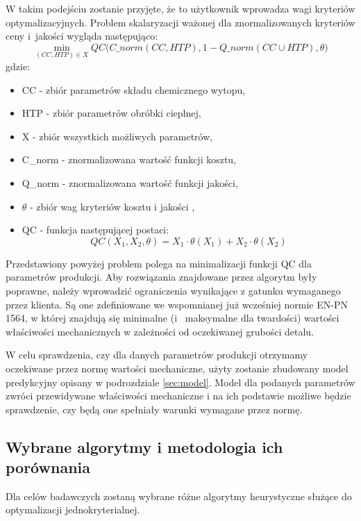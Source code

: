 W takim podejściu zostanie przyjęte, że to użytkownik wprowadza wagi kryteriów optymalizacyjnych. Problem skalaryzacji ważonej dla znormalizowanych kryteriów ceny i~jakości wygląda następująco:
\begin{equation}
     \min_{(CC,HTP) \in X} QC\Big(C\_norm(CC,HTP),1-Q\_norm(CC \cup HTP),\theta\Big) 
\end{equation}
gdzie:
\begin{itemize}
    \item CC - zbiór parametrów składu chemicznego wytopu,
    \item HTP - zbiór parametrów obróbki cieplnej,
    \item X - zbiór wszystkich możliwych parametrów,
    \item C\_norm - znormalizowana wartość funkcji kosztu,
    \item Q\_norm - znormalizowana wartość funkcji jakości,
    \item $\theta$ - zbiór wag kryteriów kosztu i jakości ,
    \item QC - funkcja następującej postaci:
    \begin{equation}
        QC(X_1, X_2, \theta) = X_1\cdot\theta(X_1) + X_2\cdot\theta(X_2)
    \end{equation}
\end{itemize}

Przedstawiony powyżej problem polega na minimalizacji funkcji QC dla parametrów produkcji. Aby rozwiązania znajdowane przez algorytm były poprawne, należy wprowadzić ograniczenia wynikające z gatunku wymaganego przez klienta. Są one zdefiniowane we wspomnianej już wcześniej normie EN-PN 1564, w której znajdują się minimalne (i~ maksymalne dla twardości) wartości właściwości mechanicznych w zależności od oczekiwanej grubości detalu. 

W celu sprawdzenia, czy dla danych parametrów produkcji otrzymamy oczekiwane przez normę wartości mechaniczne, użyty zostanie zbudowany model predykcyjny opisany w podrozdziale  \ref{sec:model}. Model dla podanych parametrów zwróci przewidywane właściwości mechaniczne i na ich podstawie możliwe będzie sprawdzenie, czy będą one spełniały warunki wymagane przez normę.

\subsection{Wybrane algorytmy i metodologia ich porównania}\label{sec:algos}
Dla celów badawczych zostaną wybrane różne algorytmy heurystyczne służące do optymalizacji jednokryterialnej.

